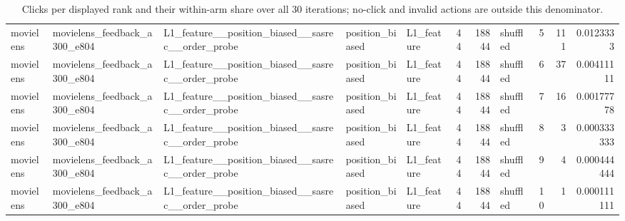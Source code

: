 \begin{table}[htbp!]
\begin{tabular}{lllllrrlrrr}
movielens & movielens\_feedback\_a300\_e804 & L1\_feature\_\_position\_biased\_\_sasrec\_\_order\_probe & position\_biased & L1\_feature & 44 & 18844 & shuffled & 5 & 111 & 0.0123333 \\
movielens & movielens\_feedback\_a300\_e804 & L1\_feature\_\_position\_biased\_\_sasrec\_\_order\_probe & position\_biased & L1\_feature & 44 & 18844 & shuffled & 6 & 37 & 0.00411111 \\
movielens & movielens\_feedback\_a300\_e804 & L1\_feature\_\_position\_biased\_\_sasrec\_\_order\_probe & position\_biased & L1\_feature & 44 & 18844 & shuffled & 7 & 16 & 0.00177778 \\
movielens & movielens\_feedback\_a300\_e804 & L1\_feature\_\_position\_biased\_\_sasrec\_\_order\_probe & position\_biased & L1\_feature & 44 & 18844 & shuffled & 8 & 3 & 0.000333333 \\
movielens & movielens\_feedback\_a300\_e804 & L1\_feature\_\_position\_biased\_\_sasrec\_\_order\_probe & position\_biased & L1\_feature & 44 & 18844 & shuffled & 9 & 4 & 0.000444444 \\
movielens & movielens\_feedback\_a300\_e804 & L1\_feature\_\_position\_biased\_\_sasrec\_\_order\_probe & position\_biased & L1\_feature & 44 & 18844 & shuffled & 10 & 1 & 0.000111111 \\
\hline
\end{tabular}
\caption{Clicks per displayed rank and their within-arm share over all 30 iterations; no-click and invalid actions are outside this denominator.}
\label{chap:results:tab:rq2_rank_counts_l1}
\end{table}
